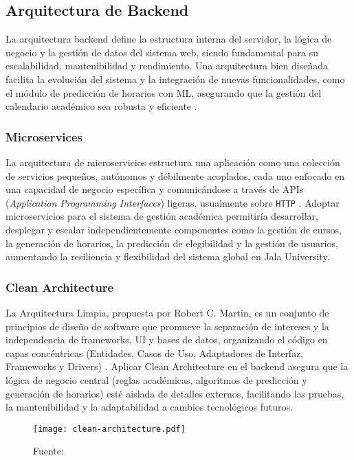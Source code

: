 \subsection{Arquitectura de Backend}
La arquitectura backend define la estructura interna del servidor, la lógica de negocio y la gestión de datos del sistema web, siendo fundamental para su escalabilidad, mantenibilidad y rendimiento.
Una arquitectura bien diseñada facilita la evolución del sistema y la integración de nuevas funcionalidades, como el módulo de predicción de horarios con ML, asegurando que la gestión del calendario académico sea robusta y eficiente \parencite{Richards2015}.

\subsubsection{Microservices}
La arquitectura de microservicios estructura una aplicación como una colección de servicios pequeños, autónomos y débilmente acoplados, cada uno enfocado en una capacidad de negocio específica y comunicándose a través de APIs (\textit{Application Programming Interfaces}) ligeras, usualmente sobre \texttt{HTTP} \parencite{Newman2015}.
Adoptar microservicios para el sistema de gestión académica permitiría desarrollar, desplegar y escalar independientemente componentes como la gestión de cursos, la generación de horarios, la predicción de elegibilidad y la gestión de usuarios, aumentando la resiliencia y flexibilidad del sistema global en Jala University.

\subsubsection{Clean Architecture}
La Arquitectura Limpia, propuesta por Robert C.
Martin, es un conjunto de principios de diseño de software que promueve la separación de intereses y la independencia de frameworks, UI y bases de datos, organizando el código en capas concéntricas (Entidades, Casos de Uso, Adaptadores de Interfaz, Frameworks y Drivers) \parencite{Martin2017}.
Aplicar Clean Architecture en el backend asegura que la lógica de negocio central (reglas académicas, algoritmos de predicción y generación de horarios) esté aislada de detalles externos, facilitando las pruebas, la mantenibilidad y la adaptabilidad a cambios tecnológicos futuros.

\begin{figure}
	\centering
	\caption{Fuente: \parencite{CleanCodeBlog}} \label{fig:cleanCodeBlog}
	\texttt{[image: clean-architecture.pdf]}
\end{figure}


